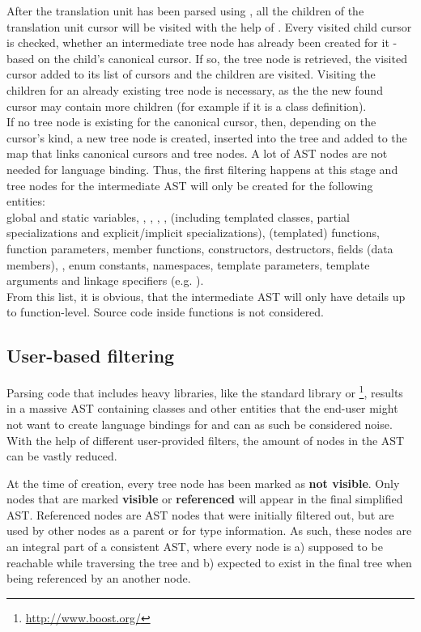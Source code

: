 After the translation unit has been parsed using , all the children of the translation unit cursor will be visited with the help of \linebreak{}. Every visited child cursor is checked, whether an intermediate tree node has already been created for it - based on the child's canonical cursor. If so, the tree node is retrieved, the visited cursor added to its list of cursors and the children are visited. Visiting the children for an already existing tree node is necessary, as the the new found cursor may contain more children (for example if it is a class definition).\\
If no tree node is existing for the canonical cursor, then, depending on the cursor's kind, a new tree node is created, inserted into the tree and added to the map that links canonical cursors and tree nodes. A lot of AST nodes are not needed for language binding. Thus, the first filtering happens at this stage and tree nodes for the intermediate AST will only be created for the following  entities:\\global and static variables, , , , ,  (including templated classes, partial specializations and explicit/implicit specializations), (templated) functions, function parameters, member functions, constructors, destructors, fields (data members), , enum constants, namespaces, template parameters, template arguments and linkage specifiers (e.g. ).\\
From this list, it is obvious, that the intermediate AST will only have details up to function-level. Source code inside functions is not considered. 

\subsection{User-based filtering}

Parsing code that includes heavy libraries, like the  standard library or \footnote{\url{http://www.boost.org/}}, results in a massive AST containing classes and other entities that the end-user might not want to create language bindings for and can as such be considered noise. With the help of different user-provided filters, the amount of nodes in the AST can be vastly reduced. 

At the time of creation, every tree node has been marked as \textbf{not visible}. Only nodes that are marked \textbf{visible} or \textbf{referenced} will appear in the final simplified AST. Referenced nodes are AST nodes that were initially filtered out, but are used by other nodes as a parent or for type information. As such, these nodes are an integral part of a consistent AST, where every node is a) supposed to be reachable while traversing the tree and b) expected to exist in the final tree when being referenced by an another node.

